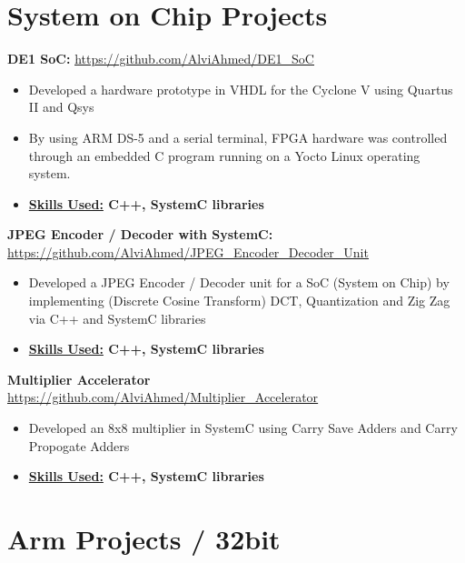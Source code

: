 \section*{System on Chip Projects}


\textbf{DE1 SoC: } \underline{\url{https://github.com/AlviAhmed/DE1_SoC}}
\begin{itemize}[noitemsep,nolistsep]
\item Developed a hardware prototype in VHDL for the Cyclone V using Quartus II and Qsys
\item By using ARM DS-5 and a serial terminal, FPGA hardware was controlled through an embedded C program running on a Yocto Linux operating system.
\item \textbf{\underline{Skills Used:} C++, SystemC libraries}
\end{itemize}


\textbf{JPEG Encoder / Decoder with SystemC: }
\underline{\url{https://github.com/AlviAhmed/JPEG_Encoder_Decoder_Unit}}
\begin{itemize}[noitemsep,nolistsep]
\item Developed a JPEG Encoder / Decoder unit for a SoC (System on Chip) by implementing
  (Discrete Cosine Transform) DCT, Quantization and Zig Zag via C++ and SystemC libraries
\item \textbf{\underline{Skills Used:} C++, SystemC libraries}
\end{itemize}


\textbf{Multiplier Accelerator}
\underline{\url{https://github.com/AlviAhmed/Multiplier_Accelerator}}
\begin{itemize}[noitemsep,nolistsep]
\item Developed an 8x8 multiplier in SystemC using Carry Save Adders and Carry Propogate Adders
\item \textbf{\underline{Skills Used:} C++, SystemC libraries}
\end{itemize}


\section*{Arm Projects / 32bit}



